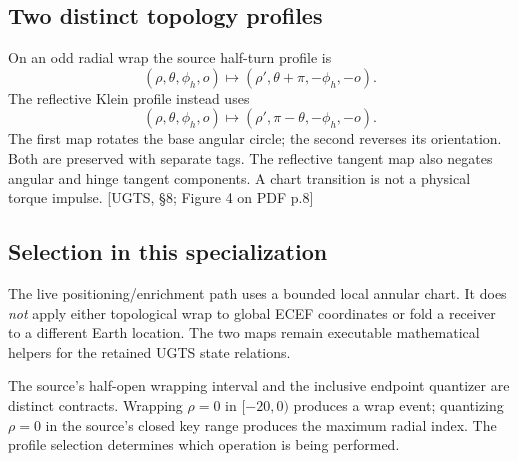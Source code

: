 \documentclass[11pt,a4paper]{article}
\newcommand{\uRef}[1]{\textcolor{muted}{[UGTS, #1]}}
\begin{document}
\subsection{Two distinct topology profiles}
On an odd radial wrap the source half-turn profile is
\begin{equation}
(\rho,\theta,\phi_h,o)\mapsto(\rho',\theta+\pi,-\phi_h,-o).
\end{equation}
The reflective Klein profile instead uses
\begin{equation}
(\rho,\theta,\phi_h,o)\mapsto(\rho',\pi-\theta,-\phi_h,-o).
\end{equation}
The first map rotates the base angular circle; the second reverses its orientation. Both are preserved with
separate tags. The reflective tangent map also negates angular and hinge tangent components. A chart
transition is not a physical torque impulse. \uRef{\S8; Figure 4 on PDF p.8}

\subsection{Selection in this specialization}
The live positioning/enrichment path uses a bounded local annular chart. It does \emph{not} apply either
topological wrap to global ECEF coordinates or fold a receiver to a different Earth location. The two maps
remain executable mathematical helpers for the retained UGTS state relations.

The source's half-open wrapping interval and the inclusive endpoint quantizer are distinct contracts.
Wrapping $\rho=0$ in $[-20,0)$ produces a wrap event; quantizing $\rho=0$ in the source's closed key range
produces the maximum radial index. The profile selection determines which operation is being performed.
\clearpage
\end{document}
